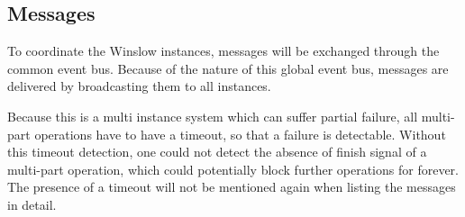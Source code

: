 \subsection{Messages}
\label{message:grace_period}

To coordinate the Winslow instances, messages will be exchanged through the common event bus.
Because of the nature of this global event bus, messages are delivered by broadcasting them to all instances.

Because this is a multi instance system which can suffer partial failure, all multi-part operations have to have a timeout, so that a failure is detectable.
Without this timeout detection, one could not detect the absence of finish signal of a multi-part operation, which could potentially block further operations for forever.
The presence of a timeout will not be mentioned again when listing the messages in detail.

